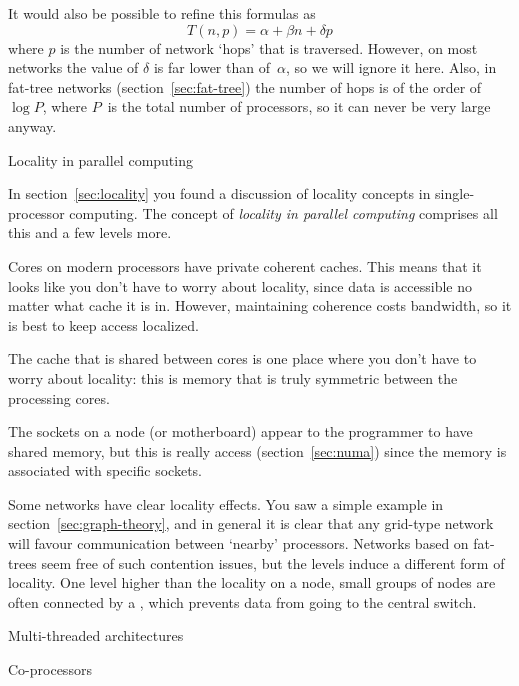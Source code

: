 It would also be possible to refine this formulas as
\[ T(n,p) = \alpha+\beta n+\delta p \]
where $p$ is the number of network `hops' that is traversed. However,
on most networks the value of $\delta$ is far lower than of~$\alpha$,
so we will ignore it here. Also, in fat-tree networks
(section~\ref{sec:fat-tree}) the number of hops is of the order of
$\log P$, where $P$~is the total number of processors, so it can never
be very large anyway.

 {Locality in parallel computing}
\label{sec:parallel-local}

In section~\ref{sec:locality} you found a discussion of 
locality concepts in single-processor computing.
The concept of \emph{locality in parallel computing}
comprises all this and a few levels more.

 Cores on modern processors have
private coherent caches. This means that
 it looks like you don't have to worry about locality, since data
  is accessible no matter what cache it is in. However, maintaining coherence
  costs bandwidth, so it is best to keep access localized.

 The cache that is shared between cores
is one place where you don't have to worry about locality: this is memory that
is truly symmetric between the processing cores.

 The sockets on a node (or motherboard)
appear to the programmer to have shared memory, but this is really 
 access (section~\ref{sec:numa}) since the memory is
associated with specific sockets.

 Some networks have clear locality effects.
You saw a simple example in section~\ref{sec:graph-theory}, and 
in general it is clear that any grid-type network will favour communication
between `nearby' processors. Networks based on fat-trees seem free of such
contention issues, but the levels induce a different form of locality.
One level higher than the locality on a node, small groups of nodes
are often connected by a , 
which prevents data from going to the central switch.


 {Multi-threaded architectures}
\label{sec:mta}


 {Co-processors}
\label{sec:copprocessor}

